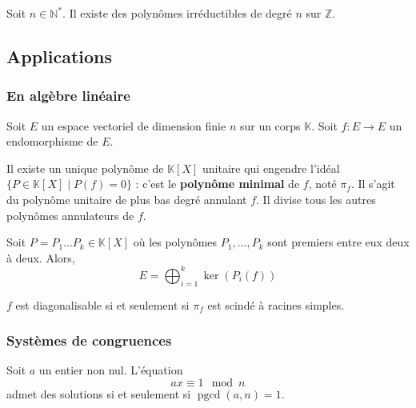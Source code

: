 	
	\begin{application}
		Soit $n \in \mathbb{N}^*$. Il existe des polynômes irréductibles de degré $n$ sur $\mathbb{Z}$.
	\end{application}
	
	\subsection{Applications}
	
	\subsubsection{En algèbre linéaire}
	
	Soit $E$ un espace vectoriel de dimension finie $n$ sur un corps $\mathbb{K}$. Soit $f : E \rightarrow E$ un endomorphisme de $E$.
	
	
	\begin{proposition}
		Il existe un unique polynôme de $\mathbb{K}[X]$ unitaire qui engendre l'idéal $\{ P \in \mathbb{K}[X] \mid P(f) = 0 \}$ : c'est le \textbf{polynôme minimal} de $f$, noté $\pi_f$. Il s'agit du polynôme unitaire de plus bas degré annulant $f$. Il divise tous les autres polynômes annulateurs de $f$.
	\end{proposition}
	
	
	\begin{theorem}
		Soit $P = P_1 \dots P_k \in \mathbb{K}[X]$ où les polynômes $P_1, \dots, P_k$ sont premiers entre eux deux à deux. Alors,
		\[ E = \bigoplus_{i=1}^k \ker(P_i(f)) \]
	\end{theorem}
	
	\begin{application}
		$f$ est diagonalisable si et seulement si $\pi_f$ est scindé à racines simples.
	\end{application}
	
	\newpage
	\subsubsection{Systèmes de congruences}
	
	
	\begin{proposition}
		Soit $a$ un entier non nul. L'équation
		\[ ax \equiv 1 \mod n \]
		admet des solutions si et seulement si $\operatorname{pgcd}(a,n) = 1$.
	\end{proposition}
	
